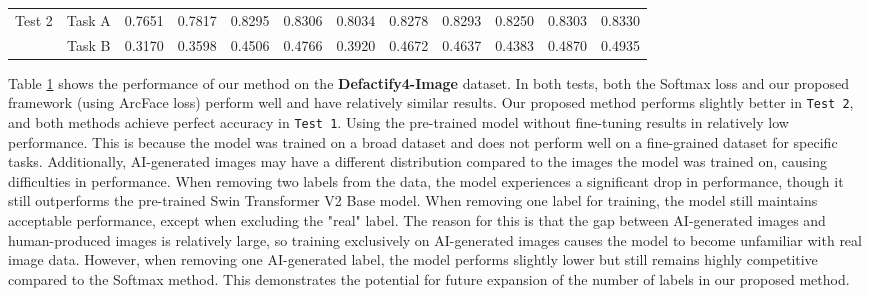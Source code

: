 \begin{table}[h]
{\begin{tabular}{cc|cccccccccc}
\multirow{2}{*}{Test 2}          & Task A          & \multicolumn{1}{c|}{0.7651}                                                                          & \multicolumn{1}{c|}{0.7817}         & 0.8295         & 0.8306    & 0.8034   & 0.8278   & 0.8293   & \multicolumn{1}{c|}{0.8250}  & 0.8303  & 0.8330 \\
                                 & Task B          & \multicolumn{1}{c|}{0.3170}                                                                          & \multicolumn{1}{c|}{0.3598}         & 0.4506         & 0.4766    & 0.3920   & 0.4672   & 0.4637   & \multicolumn{1}{c|}{0.4383}  & 0.4870  & 0.4935 \\ \hline
\end{tabular}}
\label{tab:result_image}
\end{table}

Table \ref{tab:result_image} shows the performance of our method on the \textbf{Defactify4-Image} dataset. In both tests, both the Softmax loss and our proposed framework (using ArcFace loss) perform well and have relatively similar results. Our proposed method performs slightly better in \texttt{Test 2}, and both methods achieve perfect accuracy in \texttt{Test 1}. Using the pre-trained model without fine-tuning results in relatively low performance. This is because the model was trained on a broad dataset and does not perform well on a fine-grained dataset for specific tasks. Additionally, AI-generated images may have a different distribution compared to the images the model was trained on, causing difficulties in performance. When removing two labels from the data, the model experiences a significant drop in performance, though it still outperforms the pre-trained Swin Transformer V2 Base model. When removing one label for training, the model still maintains acceptable performance, except when excluding the "real" label. The reason for this is that the gap between AI-generated images and human-produced images is relatively large, so training exclusively on AI-generated images causes the model to become unfamiliar with real image data. However, when removing one AI-generated label, the model performs slightly lower but still remains highly competitive compared to the Softmax method. This demonstrates the potential for future expansion of the number of labels in our proposed method.

